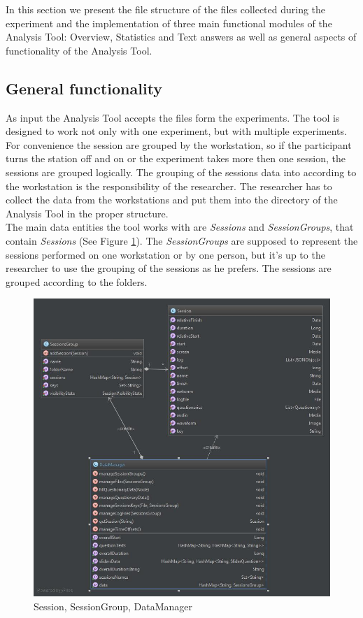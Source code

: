 In this section we present the file structure of the files collected during the experiment and the implementation of three main functional modules of the Analysis Tool: Overview, Statistics and Text answers as well as general aspects of functionality of the Analysis Tool.\\ 

\subsection{General functionality}

As input the Analysis Tool accepts the files form the experiments. The tool is designed to work not only with one experiment, but with multiple experiments. For convenience the session are grouped by the workstation, so if the participant turns the station off and on or the experiment takes more then one session, the sessions are grouped logically. The grouping of the sessions data into according to the workstation is the responsibility of the researcher. The researcher has to collect the data from the workstations and put them into the directory of the Analysis Tool in the proper structure. \\

The main data entities the tool works with are \textit{Sessions} and \textit{SessionGroups}, that contain \textit{Sessions} (See Figure \ref{fig:session_sg}). The \textit{SessionGroups} are supposed to represent the sessions performed on one workstation or by one person, but it's up to the researcher to use the grouping of the sessions as he prefers. The sessions are grouped according to the folders.\\

\begin{figure}[htb]
 \centering
\includegraphics[width=340pt]{figures/session_sg.jpg}
\caption{Session, SessionGroup, DataManager}
\label{fig:session_sg}
\end{figure}

